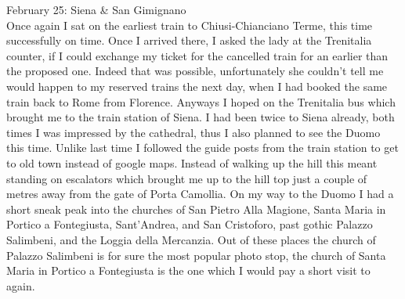 February 25: Siena \& San Gimignano\\%
Once again I sat on the earliest train to Chiusi-Chianciano Terme, this time successfully on time. Once I arrived there, I asked the lady at the Trenitalia counter, if I could exchange my ticket for the cancelled train for an earlier than the proposed one. Indeed that was possible, unfortunately she couldn't tell me would happen to my reserved trains the next day, when I had booked the same train back to Rome from Florence. Anyways I hoped on the Trenitalia bus which brought me to the train station of Siena. I had been twice to Siena already, both times I was impressed by the cathedral, thus I also planned to see the Duomo this time. Unlike last time I followed the guide posts from the train station to get to old town instead of google maps. Instead of walking up the hill this meant standing on escalators which brought me up to the hill top just a couple of metres away from the gate of Porta Camollia. On my way to the Duomo I had a short sneak peak into the churches of San Pietro Alla Magione, Santa Maria in Portico a Fontegiusta, Sant'Andrea, and San Cristoforo, past gothic Palazzo Salimbeni, and the Loggia della Mercanzia. Out of these places the church of Palazzo Salimbeni is for sure the most popular photo stop, the church of Santa Maria in Portico a Fontegiusta is the one which I would pay a short visit to again.\\
